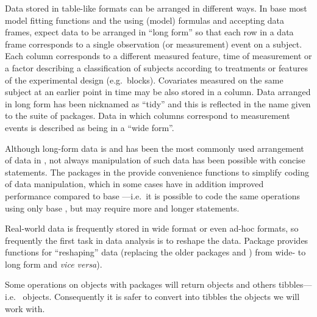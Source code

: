 \documentclass[krantz2]{krantz}\usepackage{knitr}%
\begin{document}
Data stored in table-like formats can be arranged in different ways. In base \Rlang most model fitting functions and the  using (model) formulas and accepting data frames, expect data to be arranged in ``long form'' so that each row in a data frame corresponds to a single observation (or measurement) event on a subject. Each column corresponds to a different measured feature, time of measurement or a factor describing a classification of subjects according to treatments or features of the experimental design (e.g.\ blocks). Covariates measured on the same subject at an earlier point in time may be also stored in a column. Data arranged in long form has been nicknamed as ``tidy'' and this is reflected in the name given to the  suite of packages. Data in which columns correspond to measurement events is described as being in a ``wide form''.

Although long-form data is and has been the most commonly used arrangement of data in \Rlang, not always manipulation of such data has been possible with concise \Rlang statements. The packages in the  provide convenience functions to simplify coding of data manipulation, which in some cases have in addition improved performance compared to base \Rlang---i.e.\ it is possible to code the same operations using only base \Rlang, but may require more and longer statements.

Real-world data is frequently stored in wide format or even ad-hoc formats, so frequently the first task in data analysis is to reshape the data. Package  provides functions for ``reshaping'' data (replacing the older packages  and ) from wide- to long form and \emph{vice versa}).

Some operations on \Rlang {} objects with  packages will return  objects and others tibbles---i.e.\  objects. Consequently it is safer to convert into tibbles the objects we will work with.

\begin{knitrout}\footnotesize
{}\color{fgcolor}\begin{kframe}
\begin{alltt}
 \hlkwb{<-} 
\end{alltt}
\end{kframe}
\end{knitrout}
\end{document}
